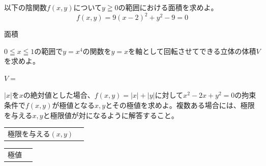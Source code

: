 \documentclass[times, 10pt,dvipdfmx]{jsarticle}
\newcommand{\ah}{\vspace{8cm}}
\newcommand{\anscol}{\underline{\hspace{6cm}}}
\newcommand{\ahd}{\vspace{10cm}}
\begin{document}
%
\begin{qlist}
\qitem 
以下の陰関数$f(x,y)$について$ y\geqq 0$の範囲における面積を求めよ。
\begin{equation}
f(x,y) = 9(x-2)^2 + y^2 - 9  = 0　 \nonumber
\end{equation}

\vspace{5mm}
面積 \anscol
\ah
\end{qlist}
\clearpage
\begin{qlist}
%
\qitem $ 0 \leqq x \leqq 1$の範囲で$y = x^4$の関数を$y = x$を軸として回転させてできる立体の体積$V$を求めよ。

\vspace{5mm}
$V=$ \anscol
\ahd
\clearpage




%
\qitem $|x|$を$x$の絶対値とした場合、$f(x,y) = |x|+|y|$に対して$x^2 - 2x + y^2 = 0 $の拘束条件で$f(x,y)$が極値となる$x,y$とその極値を求めよ。複数ある場合には、極限を与える$x,y$と極限値が対になるように解答すること。

\vspace{5mm}
\begin{tabular}{p{5cm}p{7cm}} 
極限を与える$(x,y)$  &  \underline{\hspace{8cm}} 
\end{tabular}

\vspace{1.5cm}
\begin{tabular}{p{5cm}p{7cm}} 
極値 & \underline{\hspace{8cm}} 
\end{tabular}
\ahd

\end{qlist}
\clearpage
\end{document}
